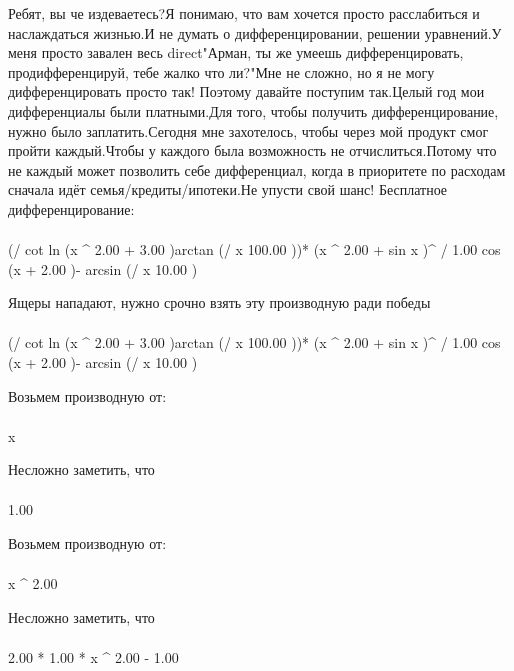 Ребят, вы че издеваетесь?Я понимаю, что вам хочется просто расслабиться и наслаждаться жизнью.И не думать о дифференцировании, решении уравнений.У меня просто завален весь direct"Арман, ты же умеешь дифференцировать, продифференцируй, тебе жалко что ли?"Мне не сложно, но я не могу дифференцировать просто так! Поэтому давайте поступим так.Целый год мои дифференциалы были платными.Для того, чтобы получить дифференцирование, нужно было заплатить.Сегодня мне захотелось, чтобы через мой продукт смог пройти каждый.Чтобы у каждого была возможность не отчислиться.Потому что не каждый может позволить себе дифференциал, когда в приоритете по расходам сначала идёт семья/кредиты/ипотеки.Не упусти свой шанс! Бесплатное дифференцирование: 
\begin{gather}
\end{gather}
\begin{}
(/ {cot ln (x ^ {2.00 }+ 3.00 )}{arctan (/ {x }{100.00 })})* (x ^ {2.00 }+ sin x )^ {/ {1.00 }{cos (x + 2.00 )}- arcsin (/ {x }{10.00 })}\\
\end{}
Ящеры нападают, нужно срочно взять эту производную ради победы
\begin{gather}
\end{gather}
\begin{}
(/ {cot ln (x ^ {2.00 }+ 3.00 )}{arctan (/ {x }{100.00 })})* (x ^ {2.00 }+ sin x )^ {/ {1.00 }{cos (x + 2.00 )}- arcsin (/ {x }{10.00 })}\\
\end{}
Возьмем производную от:
\begin{gather}
\end{gather}
\begin{}
x \\
\end{}
Несложно заметить, что
\begin{gather}
\end{gather}
\begin{}
1.00 \\
\end{}
Возьмем производную от:
\begin{gather}
\end{gather}
\begin{}
x ^ {2.00 }\\
\end{}
Несложно заметить, что
\begin{gather}
\end{gather}
\begin{}
2.00 * 1.00 * x ^ {2.00 - 1.00 }\\
\end{}
